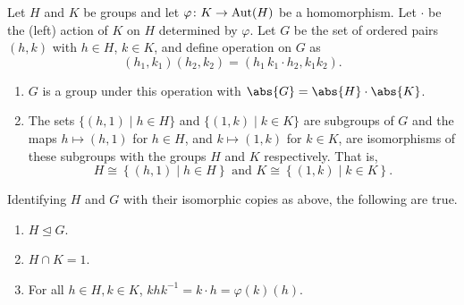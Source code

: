 \begin{theorem} \label{thm:semidirect}
    Let $H$ and $K$ be groups and let $\varphi \colon K \to \operatorname{Aut}(H)$ be a homomorphism. Let $\cdot$ be the (left) action of $K$ on $H$ determined by $\varphi$. Let $G$ be the set of ordered pairs $(h,k)$ with $h \in H$, $k \in K$, and define operation on $G$ as
    \[
        (h_1, k_1)(h_2, k_2) = (h_1 \, k_1\cdot h_2 , k_1k_2).
    \]
    \begin{enumerate}
        \item $G$ is a group under this operation with $\abs{G} = \abs{H} \cdot \abs{K}$.
        \item The sets $\{ (h,1) \mid h \in H \}$ and $\{ (1,k) \mid k \in K \}$ are subgroups of $G$ and the maps $h \mapsto (h,1)$ for $h \in H$, and $k \mapsto (1,k)$ for $k \in K$, are isomorphisms of these subgroups with the groups $H$ and $K$ respectively. That is,
        \[
            H \cong \left\{ (h,1) \mid h \in H \right\} \text{ and } K \cong \left\{ (1,k) \mid k \in K \right\}.
        \]
    \end{enumerate}
    Identifying $H$ and $G$ with their isomorphic copies as above, the following are true.
    \begin{enumerate}[resume]
        \item $H \trianglelefteq G$.
        \item $H \cap K = 1$.
        \item For all $h\in H, k \in K$, $khk^{-1} = k \cdot h = \varphi(k)(h)$.
    \end{enumerate}
\end{theorem}
